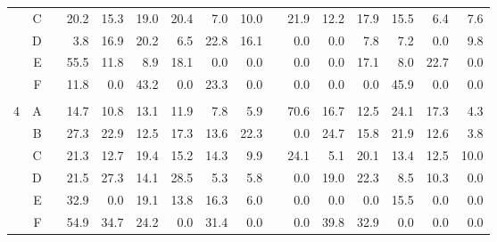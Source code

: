 \documentclass[12pt]{article}
\begin{document}
\begin{sidewaysfigure}
\begin{center}
\begin{tabular}{rr|rrrrrrrrrrrrrr}
  & C & & 20.2  & 15.3  & 19.0  & 20.4  & 7.0   & 10.0  && 21.9  & 12.2  & 17.9  & 15.5  & 6.4   & 7.6   \\
  & D & & 3.8   & 16.9  & 20.2  & 6.5   & 22.8  & 16.1  && 0.0   & 0.0   & 7.8   & 7.2   & 0.0   & 9.8   \\
  & E & & 55.5  & 11.8  & 8.9   & 18.1  & 0.0   & 0.0   && 0.0   & 0.0   & 17.1  & 8.0   & 22.7  & 0.0   \\
  & F & & 11.8  & 0.0   & 43.2  & 0.0   & 23.3  & 0.0   && 0.0   & 0.0   & 0.0   & 45.9  & 0.0   & 0.0   \\ & \\
4 & A & & 14.7  & 10.8  & 13.1  & 11.9  & 7.8   & 5.9   && 70.6  & 16.7  & 12.5  & 24.1  & 17.3  & 4.3   \\
  & B & & 27.3  & 22.9  & 12.5  & 17.3  & 13.6  & 22.3  && 0.0   & 24.7  & 15.8  & 21.9  & 12.6  & 3.8   \\
  & C & & 21.3  & 12.7  & 19.4  & 15.2  & 14.3  & 9.9   && 24.1  & 5.1   & 20.1  & 13.4  & 12.5  & 10.0  \\
  & D & & 21.5  & 27.3  & 14.1  & 28.5  & 5.3   & 5.8   && 0.0   & 19.0  & 22.3  & 8.5   & 10.3  & 0.0   \\
  & E & & 32.9  & 0.0   & 19.1  & 13.8  & 16.3  & 6.0   && 0.0   & 0.0   & 0.0   & 15.5  & 0.0   & 0.0   \\
  & F & & 54.9  & 34.7  & 24.2  & 0.0   & 31.4  & 0.0   && 0.0   & 39.8  & 32.9  & 0.0   & 0.0   & 0.0   \\
\hline
\end{tabular}
\end{center}
\end{sidewaysfigure}
\end{document}
